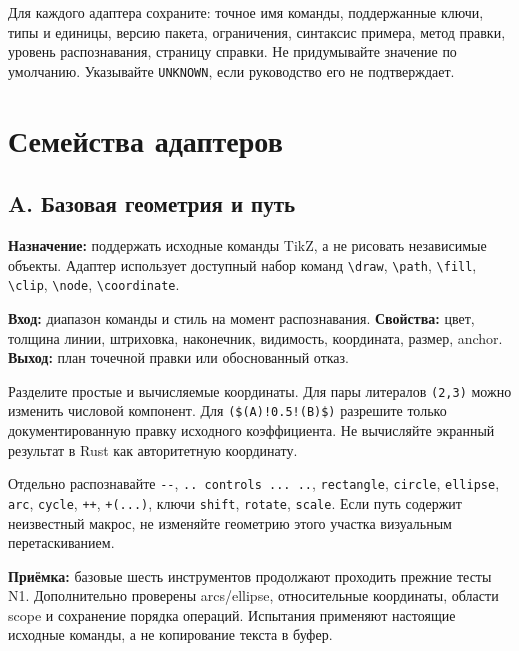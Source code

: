\documentclass[11pt,a4paper,oneside]{scrreprt}
\begin{document}
Для каждого адаптера сохраните: точное имя команды, поддержанные ключи, типы и единицы, версию пакета, ограничения, синтаксис примера, метод правки, уровень распознавания, страницу справки. Не придумывайте значение по умолчанию. Указывайте \texttt{UNKNOWN}, если руководство его не подтверждает.

\chapter{Семейства адаптеров}\label{ux441ux435ux43cux435ux439ux441ux442ux432ux430-ux430ux434ux430ux43fux442ux435ux440ux43eux432}

\section{A. Базовая геометрия и путь}\label{a.-ux431ux430ux437ux43eux432ux430ux44f-ux433ux435ux43eux43cux435ux442ux440ux438ux44f-ux438-ux43fux443ux442ux44c}

\textbf{Назначение:} поддержать исходные команды TikZ, а не рисовать независимые объекты. Адаптер использует доступный набор команд \texttt{\textbackslash{}draw}, \texttt{\textbackslash{}path}, \texttt{\textbackslash{}fill}, \texttt{\textbackslash{}clip}, \texttt{\textbackslash{}node}, \texttt{\textbackslash{}coordinate}.

\textbf{Вход:} диапазон команды и стиль на момент распознавания. \textbf{Свойства:} цвет, толщина линии, штриховка, наконечник, видимость, координата, размер, anchor. \textbf{Выход:} план точечной правки или обоснованный отказ.

Разделите простые и вычисляемые координаты. Для пары литералов \texttt{(2,3)} можно изменить числовой компонент. Для \texttt{(\$(A)!0.5!(B)\$)} разрешите только документированную правку исходного коэффициента. Не вычисляйте экранный результат в Rust как авторитетную координату.

Отдельно распознавайте \texttt{-\/-}, \texttt{..\ controls\ ...\ ..}, \texttt{rectangle}, \texttt{circle}, \texttt{ellipse}, \texttt{arc}, \texttt{cycle}, \texttt{++}, \texttt{+(...)}, ключи \texttt{shift}, \texttt{rotate}, \texttt{scale}. Если путь содержит неизвестный макрос, не изменяйте геометрию этого участка визуальным перетаскиванием.

\textbf{Приёмка:} базовые шесть инструментов продолжают проходить прежние тесты N1. Дополнительно проверены arcs/ellipse, относительные координаты, области scope и сохранение порядка операций. Испытания применяют настоящие исходные команды, а не копирование текста в буфер.
\end{document}
